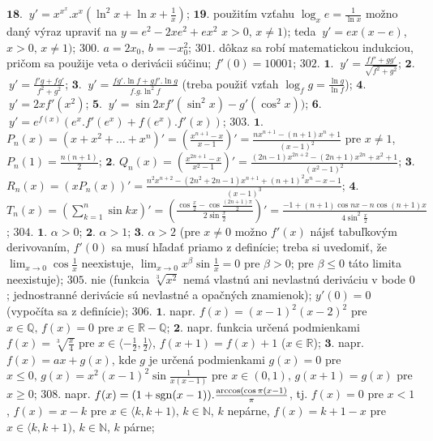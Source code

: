$\boldsymbol{18.}$ $\ y'=x^{x^{x}}.x^{x}(\ln ^{2}x+\ln x+\frac{1}{x})$;
$\boldsymbol{19.}$  použitím vzťahu $\log _{x }e=\frac{1}{\ln x}$   možno daný výraz upraviť na $y=e^{2}-2xe^{2}+ex^{2}$  $x>0, \, x\ne 1)$; teda $\ y'=ex(x-e)$,  $x>0, \, x\ne 1)$;
$\boxed{300.}$ $a=2x_{0}$, $b=-x_{0}^{2}$;
$\boxed{301.}$ dôkaz sa robí matematickou indukciou, pričom sa použije veta o derivácii súčinu; $f'(0)=10001$;
$\boxed{302.}$ $\boldsymbol{1.}$ $\ y'=\frac{ff'+gg'}{\sqrt{f^{2}+g^{2}}}$;
$\boldsymbol{2.}$ $\ y'=\frac{f'g+fg'}{f^{2}+g^{2}}$;
$\boldsymbol{3.}$ $\ y'=\frac{fg'.\ln f+gf'.\ln g}{f.g.\ln^{2}f}$ (treba použiť vzťah  $\log _{f}g=\frac{\ln g}{\ln f}$);
$\boldsymbol{4.}$ $\ y'=2x f'(x^{2})$;
$\boldsymbol{5.}$ $\ y'=\sin 2x f'(\sin ^{2}x)-g'(\cos ^{2}x))$;
$\boldsymbol{6.}$ $\ y'=e^{f(x)}(e^{x}.f'(e^{x})+f(e^{x}).f'(x))$;
$\boxed{303.}$ $\boldsymbol{1.}$ $P_{n}(x)=(x+x^{2}+...+x^{n})'=(\frac{x^{n+1}-x}{x-1})'=\frac{nx^{n+1}-(n+1)x^{n}+1}{(x-1)^{2}} $ pre $x \ne 1$,  $P_{n}(1)=\frac{n(n+1)}{2} $;
$\boldsymbol{2.}$ $Q_{n}(x)=(\frac{x^{2n+1}-x}{x^{2}-1})'=\frac{(2n-1)x^{2n+2}-(2n+1)x^{2n}+x^{2}+1}{(x^{2}-1)^{2}}$; 
$\boldsymbol{3.}$ $R_{n}(x)=(xP_{n}(x))'=\frac{n^{2}x^{n+2}-(2n^{2}+2n-1)x^{n+1}+(n+1)^{2}x^{n}-x-1}{(x-1)^{3}}$; 
$\boldsymbol{4.}$ $T_{n}(x)=(\sum_{k=1}^n \sin kx)'=(\frac{\cos \frac{x}{2}- \cos \frac{(2n+1)\pi}{2}}{2\sin \frac{x}{2} })'=\frac{-1+(n+1)\cos nx -n \cos (n+1)x}{4 \sin ^{2}\frac{x}{2}}$;
$\boxed{304.}$ $\boldsymbol{1.}$ $\alpha >0 $;
$\boldsymbol{2.}$ $\alpha >1 $;
$\boldsymbol{3.}$ $\alpha >2 $ (pre $x \ne 0$ možno  $f'(x)$ nájsť tabuľkovým derivovaním, $f'(0)$ sa musí hľadať priamo z definície; treba si uvedomiť, že $\lim_{x \to 0}\cos \frac{1}{x} $ neexistuje, $\lim_{x \to 0}x^{\beta} \sin \frac{1}{x}=0 $ pre $\beta >0 $; pre $\beta \leq 0 $ táto limita neexistuje);
$\boxed{305.}$ nie (funkcia $\sqrt[3]{x^{2}}$ nemá vlastnú ani nevlastnú deriváciu v bode $0$; jednostranné derivácie sú nevlastné a opačných znamienok); $y'(0)=0$ (vypočíta sa z definície);
$\boxed{306.}$ $\boldsymbol{1.}$ napr. $f(x)=(x-1)^{2}(x-2)^{2} $ pre $x \in \mathbb{Q}, \, f(x)=0 $ pre $x \in \mathbb{R} -\mathbb{Q}$;
$\boldsymbol{2.}$ napr. funkcia určená podmienkami $f(x)=\sqrt[3]{\frac{x}{4}}$ pre $x \in \langle -\frac{1}{2},\frac{1}{2}\rangle$, $f(x+1)=f(x)+1 $ ($x \in \mathbb{R}$);
$\boldsymbol{3.}$ napr. $f(x)=ax+g(x)$, kde $g$ je určená podmienkami $g(x)=0$ pre $x \leq 0, \, g(x)=x^{2}(x-1)^{2}\sin \frac{1}{x(x-1)} $  pre $x \in (0,1), \,g(x+1)=g(x) $ pre $x \geq 0 $;
$\boxed{308.}$ napr. $f(x)=(1+\operatorname{sgn} (x-1)). \frac{\arccos(\cos \pi(x-1)}{\pi}$, tj. $f(x)=0 $ pre $x<1 $, $f(x)=x-k $ pre $x\in \langle k, k+1), \, k \in \mathbb{N} $, $k$ nepárne, $f(x)=k+1-x$ pre $x\in \langle k, k+1), \, k \in \mathbb{N} $, $k$ párne;
